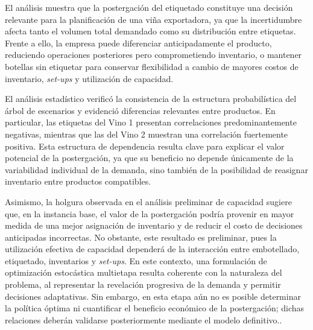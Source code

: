 El análisis muestra que la postergación del etiquetado constituye una decisión relevante para la planificación de una viña exportadora, ya que la incertidumbre afecta tanto el volumen total demandado como su distribución entre etiquetas. Frente a ello, la empresa puede diferenciar anticipadamente el producto, reduciendo operaciones posteriores pero comprometiendo inventario, o mantener
botellas sin etiquetar para conservar flexibilidad a cambio de mayores costos de inventario, \textit{set-ups} y utilización de capacidad.

El análisis estadístico verificó la consistencia de la estructura probabilística del árbol de escenarios y evidenció diferencias relevantes entre productos. En particular, las etiquetas del Vino 1 presentan correlaciones predominantemente
negativas, mientras que las del Vino 2 muestran una correlación fuertemente positiva. Esta estructura de dependencia resulta clave para explicar el valor potencial de la postergación, ya que su beneficio no depende únicamente de la variabilidad individual de la demanda, sino también de la posibilidad de reasignar inventario entre productos compatibles.

Asimismo, la holgura observada en el análisis preliminar de capacidad sugiere que, en la instancia base, el valor de la postergación podría provenir en mayor medida de una mejor asignación de inventario y de reducir el costo de decisiones anticipadas incorrectas. No obstante, este resultado es preliminar, pues la utilización efectiva de capacidad dependerá de la interacción entre embotellado, etiquetado, inventarios y \textit{set-ups}. En este contexto, una formulación de optimización estocástica multietapa resulta coherente con la naturaleza del problema, al representar la revelación progresiva de la demanda y permitir decisiones adaptativas. Sin embargo, en esta etapa aún no es posible determinar la política óptima ni cuantificar el beneficio económico de la postergación; dichas relaciones deberán validarse posteriormente mediante el modelo definitivo.. 